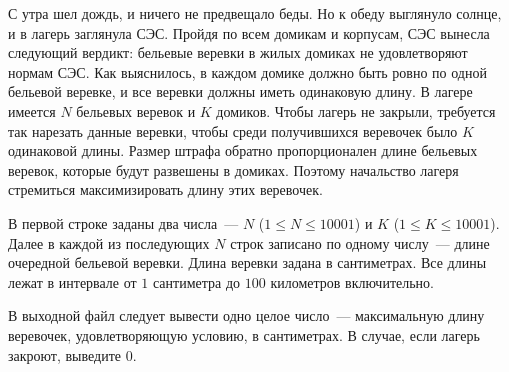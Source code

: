 С утра шел дождь, и ничего не предвещало беды. Но к обеду выглянуло солнце, и в лагерь заглянула СЭС. 
Пройдя по всем домикам и корпусам, СЭС вынесла следующий вердикт: бельевые веревки в жилых домиках не удовлетворяют нормам СЭС. 
Как выяснилось, в каждом домике должно быть ровно по одной бельевой веревке, и все веревки должны иметь одинаковую длину.
В лагере имеется $N$ бельевых веревок и $K$ домиков. Чтобы лагерь не закрыли, требуется так нарезать данные веревки, 
чтобы среди получившихся веревочек было $K$ одинаковой длины.
Размер штрафа обратно пропорционален длине бельевых веревок, которые будут развешены в домиках. 
Поэтому начальство лагеря стремиться максимизировать длину этих веревочек.

\InputFile

В первой строке заданы два числа~--- $N$ ($1 \leqslant N \leqslant 10001$) и $K$ ($1 \leqslant K \leqslant 10001$). 
Далее в каждой из последующих $N$ строк записано по одному числу~--- длине очередной бельевой веревки. 
Длина веревки задана в сантиметрах. Все длины лежат в интервале от $1$ сантиметра до $100$ километров включительно.


\OutputFile

В выходной файл следует вывести одно целое число~--- максимальную длину веревочек,
удовлетворяющую условию, в сантиметрах. В случае, если лагерь закроют, выведите $0$.
